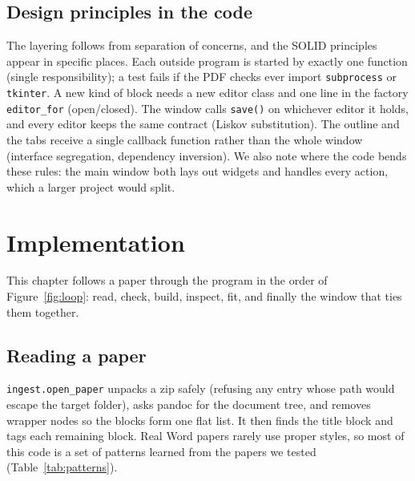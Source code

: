 \documentclass[11pt,a4paper,oneside,openany]{book}
\newcommand{\code}[1]{\texttt{#1}}
\begin{document}
\section{Design principles in the code}
The layering follows from separation of concerns, and the SOLID principles appear in specific places.
Each outside program is started by exactly one function (single responsibility); a test fails if the PDF
checks ever import \code{subprocess} or \code{tkinter}. A new kind of block needs a new editor class and one
line in the factory \code{editor\_for} (open/closed). The window calls \code{save()} on whichever editor it
holds, and every editor keeps the same contract (Liskov substitution). The outline and the tabs receive a
single callback function rather than the whole window (interface segregation, dependency inversion). We
also note where the code bends these rules: the main window both lays out widgets and handles every
action, which a larger project would split.

\chapter{Implementation}\label{ch:impl}

\begin{takeaway}
This chapter follows a paper through the program in the order of Figure~\ref{fig:loop}: read, check,
build, inspect, fit, and finally the window that ties them together.
\end{takeaway}

\section{Reading a paper}
\code{ingest.open\_paper} unpacks a zip safely (refusing any entry whose path would escape the target
folder), asks pandoc for the document tree, and removes wrapper nodes so the blocks form one flat list. It
then finds the title block and tags each remaining block. Real Word papers rarely use proper styles, so
most of this code is a set of patterns learned from the papers we tested (Table~\ref{tab:patterns}).
\end{document}
